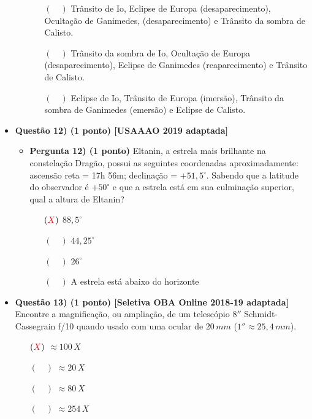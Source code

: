\documentclass[a4paper, 12pt]{article}
\newcommand{\red}[1]{\textcolor{red}{#1}}
\begin{document}
\begin{flushleft}
\begin{itemize}
\begin{itemize}
\begin{itemize}
                            \item[$(\quad)$] Trânsito de Io, Eclipse de Europa (desaparecimento), Ocultação de Ganimedes, (desaparecimento) e Trânsito da sombra de Calisto.
                            \item[$(\quad)$] Trânsito da sombra de Io, Ocultação de Europa (desaparecimento), Eclipse de Ganimedes (reaparecimento) e Trânsito de Calisto.
                            \item[$(\quad)$] Eclipse de Io, Trânsito de Europa (imersão), Trânsito da sombra de Ganimedes (emersão) e Eclipse de Calisto.
                        \end{itemize}
                \end{itemize}

            \item \textbf{Questão 12) (1 ponto) [USAAAO 2019 adaptada]}
                \begin{itemize}
                    \item \textbf{Pergunta 12) (1 ponto)} Eltanin, a estrela mais brilhante na constelação Dragão, possui as seguintes coordenadas aproximadamente: ascensão reta = 17h 56m; declinação = $+51,5^{\circ}$. Sabendo que a latitude do observador é $+50^{\circ}$ e que a estrela está em sua culminação superior, qual a altura de Eltanin?
                        \begin{itemize}
                            \item[$(\red{X})$] $88,5^{\circ}$
                            \item[$(\quad)$] $44,25^{\circ}$
                            \item[$(\quad)$] $26^{\circ}$
                            \item[$(\quad)$] A estrela está abaixo do horizonte
                        \end{itemize}
                \end{itemize}
            
            \item \textbf{Questão 13) (1 ponto) [Seletiva OBA Online 2018-19 adaptada]} Encontre a magnificação, ou ampliação, de um telescópio $8''$ Schmidt-Cassegrain f/10 quando usado com uma ocular de $20 \, mm$ ($1'' \approx 25,4 \, mm$).
                \begin{itemize}
                    \item[$(\red{X})$] $\approx 100 \, X$
                    \item[$(\quad)$] $\approx 20 \, X$
                    \item[$(\quad)$] $\approx 80 \, X$
                    \item[$(\quad)$] $\approx 254 \, X$
                \end{itemize}
            

\end{itemize}
\end{flushleft}
\end{document}
